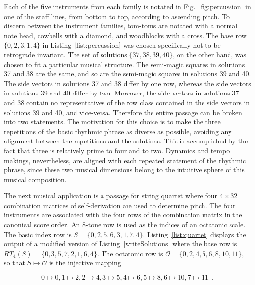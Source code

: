 Each of the five instruments from each family is notated in Fig.~\ref{fig:percussion} in one of the staff lines, from bottom to top, according to ascending pitch. To discern between the instrument families, tom-toms are notated with a normal note head, cowbells with a diamond, and woodblocks with a cross. The base row $\{0, 2, 3, 1, 4\}$ in Listing~\ref{list:percussion} was chosen specifically not to be retrograde invariant. The set of solutions $\{37, 38, 39, 40\}$, on the other hand, was chosen to fit a particular musical structure. The semi-magic squares in solutions 37 and 38 are the same, and so are the semi-magic squares in solutions 39 and 40. The side vectors in solutions 37 and 38 differ by one row, whereas the side vectors in solutions 39 and 40 differ by two. Moreover, the side vectors in solutions 37 and 38 contain no representatives of the row class contained in the side vectors in solutions 39 and 40, and vice-versa. Therefore the entire passage can be broken into two statements. The motivation for this choice is to make the three repetitions of the basic rhythmic phrase as diverse as possible, avoiding any alignment between the repetitions and the solutions. This is accomplished by the fact that three is relatively prime to four and to two. Dynamics and tempo makings, nevertheless, are aligned with each repeated statement of the rhythmic phrase, since these two musical dimensions belong to the intuitive sphere of this musical composition.

The next musical application is a passage for string quartet where four $4 \times 32$ combination matrices of self-derivation are used to determine pitch. The four instruments are associated with the four rows of the combination matrix in the canonical score order. An 8-tone row is used as the indices of an octatonic scale. The basic index row is $S = \{0, 2, 5, 6, 3, 1, 7, 4\}$. Listing~\ref{list:quartet} displays the output of a modified version of Listing~\ref{writeSolutions} where the base row is $RT_4(S) = \{0, 3, 5, 7, 2, 1, 6, 4\}$. The octatonic row is $\mathcal{O} = \{0, 2, 4, 5, 6, 8, 10, 11\}$, so that $S \mapsto \mathcal{O}$ is the injective mapping

\begin{equation}
	0 \mapsto 0, 1 \mapsto 2, 2 \mapsto 4, 3 \mapsto 5, 4 \mapsto 6, 5 \mapsto 8, 6 \mapsto 10, 7 \mapsto 11 \enspace . 
\end{equation}

